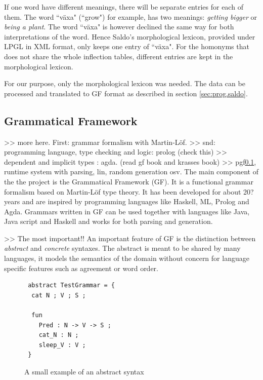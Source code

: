 \documentclass{report}
\begin{document}
If one word
have different meanings, there will be separate entries for each of them.
The word ``växa" (``grow") for example, has two meanings: \emph{getting bigger}
or \emph{being a plant}. 
The word ``växa" is however declined the same way for both interpretations of the word.
Hence Saldo's morphological lexicon, provided under LPGL in XML format,
only keeps one entry of ``växa".
For the homonyms that does not share the whole inflection tables, different entries are 
kept in the morphological lexicon.

For our purpose, only the morphological lexicon was needed.
The data can be processed and translated to GF format as described in 
section \ref{sec:prog.saldo}.

\subsection{Grammatical Framework}
>> more here. First: grammar formalism with Martin-Löf.
>> snd: programming language, type checking and logic: prolog (check this)
>> dependent and implicit types : agda. (read gf book and krasses book)
>> pgf\ref{}, runtime system with parsing, lin, random generation osv.
The main component of the the project is the Grammatical Framework\cite{gfbok} (GF). It is
a functional grammar formalism based on Martin-Löf type theory.
It has been developed for about 20? years and are inspired by programming languages
like Haskell\cite{haskell},
ML\cite{ml}, Prolog\cite{bratko} and
Agda\cite{agda}.
Grammars written in GF can be used together with languages 
like Java, Java script and Haskell and works for both parsing and generation.

>> The most important!!
An important feature of GF is
the distinction between
\textit{abstract} and \textit{concrete} syntaxes. The abstract is meant to be
shared by many languages, it models the semantics of the domain without concern for
language specific features such as agreement or word order.

\begin{figure}[h]
\begin{verbatim}
 abstract TestGrammar = {
  cat N ; V ; S ;

  fun 
    Pred : N -> V -> S ;
    cat_N : N ;
    sleep_V : V ;
 }
\end{verbatim}
\caption{A small example of an abstract syntax}
\label{fig:gfAbstract1}
\end{figure}
\end{document}
